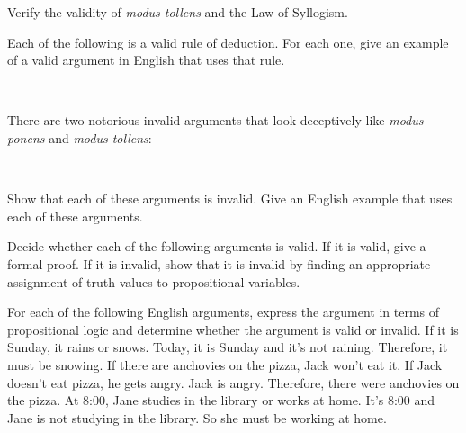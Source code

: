 \begin{exercises}

\problem Verify the validity of \textit{modus tollens} and the Law of
Syllogism.

\problem Each of the following is a valid rule of deduction.
For each one, give an example of a valid argument in English that
uses that rule.
\begin{center}
\mbox{\qquad
{}\qquad
{}\qquad
{}\qquad
{}
}
\end{center}

\problem There are two notorious invalid arguments that look
deceptively like \textit{modus ponens} and \textit{modus tollens}:
\begin{center}
\mbox{\qquad
{}\qquad
{}\qquad
}
\end{center}
Show that each of these arguments is invalid.  Give an English
example that uses each of these arguments.

\problem Decide whether each of the following arguments is valid.
If it is valid, give a formal proof.  If it is invalid, show that
it is invalid by finding an appropriate assignment of truth values
to propositional variables.
\smallskip
{}


\problem For each of the following English arguments, express the
argument in terms of propositional logic and determine whether the
argument is valid or invalid.
\ppart If it is Sunday, it rains or snows.  Today, it is Sunday
and it's not raining.  Therefore, it must be snowing.
\ppart If there are anchovies on the pizza, Jack won't eat it.
If Jack doesn't eat pizza, he gets angry.  Jack is angry.
Therefore, there were anchovies on the pizza.
\ppart At 8:00, Jane studies in the library or works at home.
It's 8:00 and Jane is not studying in the library.  So she must
be working at home.



\end{exercises}



